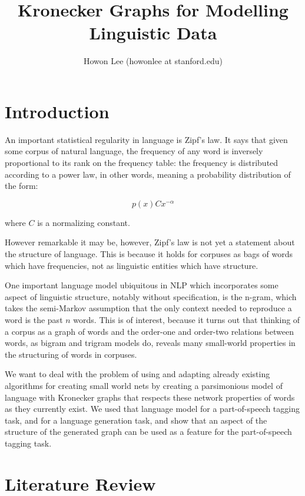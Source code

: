 \documentclass[12pt]{article}
\begin{document}
\title{Kronecker Graphs for Modelling Linguistic Data}
\author{Howon Lee (howonlee at stanford.edu)}
\maketitle

\section{Introduction}

An important statistical regularity in language is Zipf's law. It says that given some corpus of natural language, the frequency of any word is inversely proportional to its rank on the frequency table: the frequency is distributed according to a power law, in other words, meaning a probability distribution of the form:

$$p(x) Cx^{-\alpha} $$

where $C$ is a normalizing constant.

However remarkable it may be, however, Zipf's law is not yet a statement about the structure of language. This is because it holds for corpuses as bags of words which have frequencies, not as linguistic entities which have structure. \cite{smallworldlang}

One important language model ubiquitous in NLP which incorporates some aspect of linguistic structure, notably without specification, is the n-gram, which takes the semi-Markov assumption that the only context needed to reproduce a word is the past $n$ words. This is of interest, because it turns out that thinking of a corpus as a graph of words and the order-one and order-two relations between words, as bigram and trigram models do, reveals many small-world properties in the structuring of words in corpuses.

We want to deal with the problem of using and adapting already existing algorithms for creating small world nets by creating a parsimonious model of language with Kronecker graphs that respects these network properties of words as they currently exist. We used that language model for a part-of-speech tagging task, and for a language generation task, and show that an aspect of the structure of the generated graph can be used as a feature for the part-of-speech tagging task.

\section{Literature Review}
\end{document}
